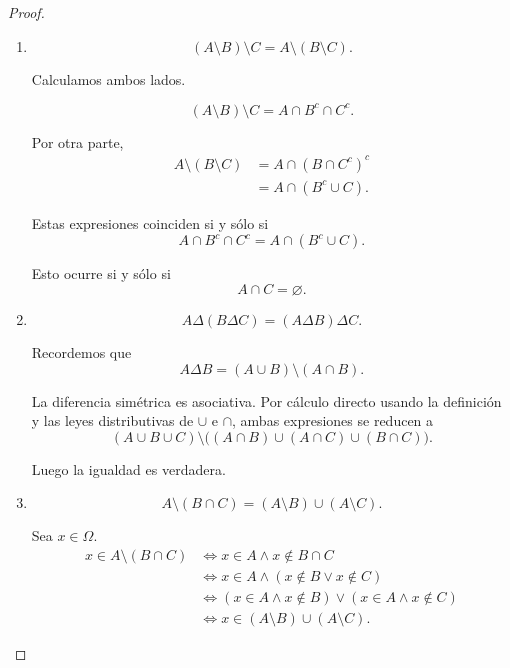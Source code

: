 \documentclass[12pt,a4paper]{article}
\begin{document}
\begin{proof}
\begin{enumerate}[label=(\alph*)]
            En particular, una condición suficiente es $B=\varnothing$.
    
            \item
            \[
                (A\setminus B)\setminus C
                = A\setminus(B\setminus C).
            \]
    
            Calculamos ambos lados.
    
            \[
                (A\setminus B)\setminus C
                = A\cap B^c \cap C^c.
            \]
    
            Por otra parte,
            \begin{align*}
                A\setminus(B\setminus C)
                &= A\cap(B\cap C^c)^c \\
                &= A\cap(B^c\cup C).
            \end{align*}
    
            Estas expresiones coinciden si y sólo si
            \[
                A\cap B^c\cap C^c
                = A\cap(B^c\cup C).
            \]
    
            Esto ocurre si y sólo si
            \[
                A\cap C=\varnothing.
            \]
    
            \item
            \[
                A\Delta(B\Delta C)
                = (A\Delta B)\Delta C.
            \]
    
            Recordemos que
            \[
                A\Delta B=(A\cup B)\setminus(A\cap B).
            \]
    
            La diferencia simétrica es asociativa.
            Por cálculo directo usando la definición
            y las leyes distributivas de $\cup$ e $\cap$,
            ambas expresiones se reducen a
            \[
                (A\cup B\cup C)
                \setminus
                \big((A\cap B)\cup(A\cap C)\cup(B\cap C)\big).
            \]
    
            Luego la igualdad es verdadera.
    
            \item
            \[
                A\setminus(B\cap C)
                = (A\setminus B)\cup(A\setminus C).
            \]
    
            Sea $x\in\Omega$.
            \begin{align*}
                x\in A\setminus(B\cap C)
                &\iff x\in A \land x\notin B\cap C \\
                &\iff x\in A \land (x\notin B \lor x\notin C) \\
                &\iff (x\in A\land x\notin B)
                    \lor
                    (x\in A\land x\notin C) \\
                &\iff x\in (A\setminus B)\cup(A\setminus C).
            \end{align*}
    

\end{enumerate}
\end{proof}
\end{document}

